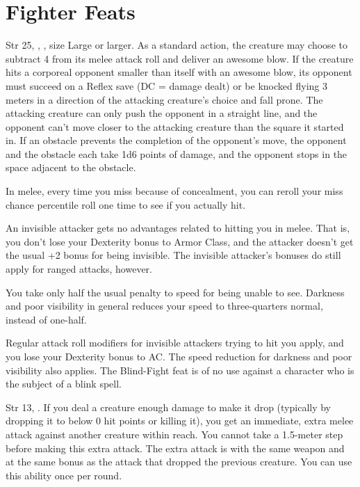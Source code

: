 \section{Fighter Feats}

{Str 25, , , size Large or larger.}
{As a standard action, the creature may choose to subtract 4 from its melee attack roll and deliver an awesome blow. If the creature hits a corporeal opponent smaller than itself with an awesome blow, its opponent must succeed on a Reflex save (DC = damage dealt) or be knocked flying 3 meters in a direction of the attacking creature's choice and fall prone. The attacking creature can only push the opponent in a straight line, and the opponent can't move closer to the attacking creature than the square it started in. If an obstacle prevents the completion of the opponent's move, the opponent and the obstacle each take 1d6 points of damage, and the opponent stops in the space adjacent to the obstacle.}

{}
{In melee, every time you miss because of concealment, you can reroll your miss chance percentile roll one time to see if you actually hit.

An invisible attacker gets no advantages related to hitting you in melee. That is, you don't lose your Dexterity bonus to Armor Class, and the attacker doesn't get the usual +2 bonus for being invisible. The invisible attacker's bonuses do still apply for ranged attacks, however.

You take only half the usual penalty to speed for being unable to see. Darkness and poor visibility in general reduces your speed to three-quarters normal, instead of one-half.}
{Regular attack roll modifiers for invisible attackers trying to hit you apply, and you lose your Dexterity bonus to AC. The speed reduction for darkness and poor visibility also applies.}
{The Blind-Fight feat is of no use against a character who is the subject of a blink spell.}{}

{Str 13, .}
{If you deal a creature enough damage to make it drop (typically by dropping it to below 0 hit points or killing it), you get an immediate, extra melee attack against another creature within reach. You cannot take a 1.5-meter step before making this extra attack. The extra attack is with the same weapon and at the same bonus as the attack that dropped the previous creature. You can use this ability once per round.}

